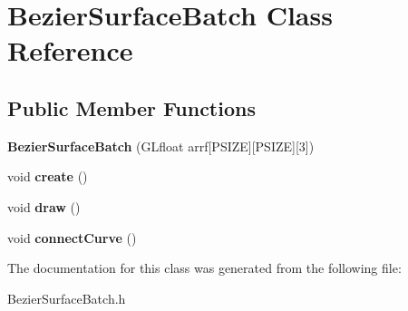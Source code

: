 \hypertarget{class_bezier_surface_batch}{}\section{Bezier\+Surface\+Batch Class Reference}
\label{class_bezier_surface_batch}
\subsection*{Public Member Functions}
\begin{DoxyCompactItemize}
\item 
\mbox{\label{class_bezier_surface_batch_a548db6175908827d14b50829f1a3fecb}} 
{\bfseries Bezier\+Surface\+Batch} (G\+Lfloat arrf\mbox{[}P\+S\+I\+ZE\mbox{]}\mbox{[}P\+S\+I\+ZE\mbox{]}\mbox{[}3\mbox{]})
\item 
\mbox{\label{class_bezier_surface_batch_a178c5429aaa994e86e0684c561f01c57}} 
void {\bfseries create} ()
\item 
\mbox{\label{class_bezier_surface_batch_a089ccb0b0a628c1d61086eec7eb9e4cd}} 
void {\bfseries draw} ()
\item 
\mbox{\label{class_bezier_surface_batch_acabb1d09583b705e194079f8eef45f5c}} 
void {\bfseries connect\+Curve} ()
\end{DoxyCompactItemize}


The documentation for this class was generated from the following file\+:\begin{DoxyCompactItemize}
\item 
Bezier\+Surface\+Batch.\+h\end{DoxyCompactItemize}
